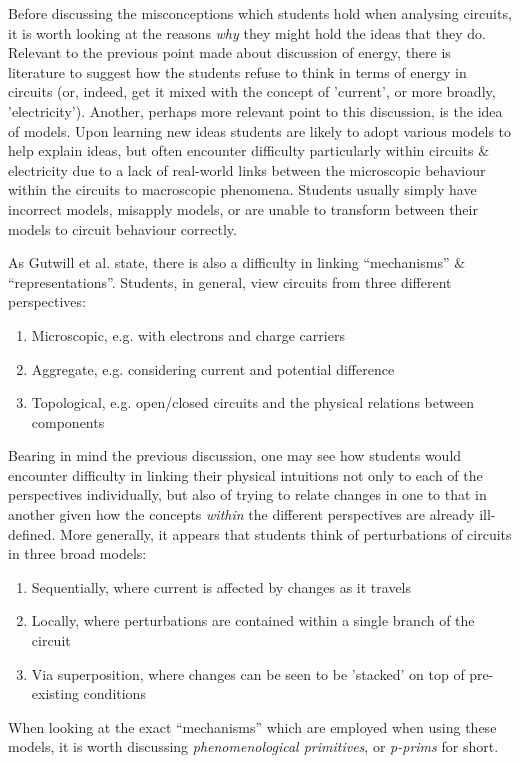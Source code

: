 \documentclass[a4paper,openany,nobib]{tufte-book}
\begin{document}
Before discussing the misconceptions which students hold when analysing circuits, it is worth looking at the reasons \emph{why} they might hold the ideas that they do.
Relevant to the previous point made about discussion of energy, there is literature to suggest how the students refuse to think in terms of energy in circuits (or, indeed, get it mixed with the concept of 'current', or more broadly, 'electricity').
Another, perhaps more relevant point to this discussion, is the idea of models.
Upon learning new ideas students are likely to adopt various models to help explain ideas\autocite{bagno2000}, but often encounter difficulty particularly within circuits \& electricity due to a lack of real-world links between the microscopic behaviour within the circuits to macroscopic phenomena. Students usually simply have incorrect models, misapply models, or are unable to transform between their models to circuit behaviour correctly.

As Gutwill et al.\autocite{gutwill99} state, there is also a difficulty in linking ``mechanisms'' \& ``representations''.
Students, in general, view circuits from three different perspectives:
\begin{enumerate}
	\item Microscopic, e.g. with electrons and charge carriers
	\item Aggregate, e.g. considering current and potential difference
	\item Topological, e.g. open/closed circuits and the physical relations between components
\end{enumerate}
Bearing in mind the previous discussion, one may see how students would encounter difficulty in linking their physical intuitions not only to each of the perspectives individually, but also of trying to relate changes in one to that in another given how the concepts \emph{within} the different perspectives are already ill-defined. More generally, it appears that students think of perturbations of circuits in three broad models\autocite{ates2005}:
\begin{enumerate}
	\item Sequentially, where current is affected by changes as it travels
	\item Locally, where perturbations are contained within a single branch of the circuit
	\item Via superposition, where changes can be seen to be 'stacked' on top of pre-existing conditions
\end{enumerate}
When looking at the exact ``mechanisms'' which are employed when using these models, it is worth discussing \emph{phenomenological primitives}, or \emph{p-prims} for short\autocite{prim}. 
\end{document}

